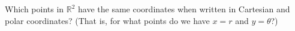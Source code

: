 \begin{problem}
Which points in $\mathbb{R}^2$ have the same coordinates when written in Cartesian and polar coordinates? (That is, for what points do we have $x=r$ and $y=\theta$?)
\end{problem}